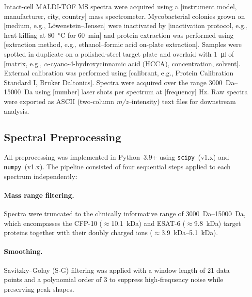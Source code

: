 \documentclass[journal=ancham, manuscript=article, layout=traditional]{achemso}
\begin{document}
Intact-cell MALDI-TOF MS spectra were acquired using a [instrument
model, manufacturer, city, country] mass spectrometer.
Mycobacterial colonies grown on [medium, e.g., Löwenstein--Jensen]
were inactivated by [inactivation protocol, e.g., heat-killing at
\SI{80}{\celsius} for \SI{60}{\minute}] and protein extraction was
performed using [extraction method, e.g., ethanol--formic acid
on-plate extraction].
Samples were spotted in duplicate on a polished-steel target plate
and overlaid with \SI{1}{\micro\litre} of [matrix, e.g., $\alpha$-cyano-4-hydroxycinnamic
acid (HCCA), concentration, solvent].
External calibration was performed using [calibrant, e.g., Protein
Calibration Standard I, Bruker Daltonics].
Spectra were acquired over the range \SIrange{3000}{15000}{\dalton}
using [number] laser shots per spectrum at [frequency] Hz.
Raw spectra were exported as ASCII (two-column \textit{m/z}--intensity)
text files for downstream analysis.

\subsection{Spectral Preprocessing}

All preprocessing was implemented in Python~3.9+ using
\texttt{scipy}~(v1.x) and \texttt{numpy}~(v1.x).\cite{SciPy, NumPy}
The pipeline consisted of four sequential steps applied to each
spectrum independently:

\paragraph{Mass range filtering.}
Spectra were truncated to the clinically informative range of
\SIrange{3000}{15000}{\dalton}, which encompasses the CFP-10
($\approx$\SI{10.1}{\kilo\dalton}) and ESAT-6
($\approx$\SI{9.8}{\kilo\dalton}) target proteins together with their
doubly charged ions ($\approx$\SIrange{3.9}{5.1}{\kilo\dalton}).

\paragraph{Smoothing.}
Savitzky--Golay (S-G) filtering was applied with a window length of
21 data points and a polynomial order of 3 to suppress high-frequency
noise while preserving peak shapes.\cite{Savitzky1964}
\end{document}
